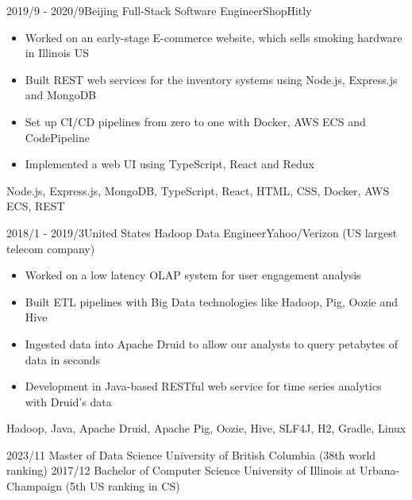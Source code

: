 \documentclass[localFont,alternative]{resume_template}
\begin{document}
\begin{experiences}
    \emptySeparator

    \experience
    {2019/9 - 2020/9}{Beijing}
    {Full-Stack Software Engineer}{ShopHitly}
    {
        \begin{itemize}
        \item Worked on an early-stage E-commerce website, which sells smoking hardware in Illinois US
        \item Built REST web services for the inventory systems using Node.js, Express.js and MongoDB
        \item Set up CI/CD pipelines from zero to one with Docker, AWS ECS and CodePipeline
        \item Implemented a web UI using TypeScript, React and Redux
        \end{itemize}
    }
    {Node.js, Express.js, MongoDB, TypeScript, React, HTML, CSS, Docker, AWS ECS, REST}

    \emptySeparator

    \experience
    {2018/1 - 2019/3}{United States}
    {Hadoop Data Engineer}{Yahoo/Verizon (US largest telecom company)}
    {
        \begin{itemize}
        \item Worked on a low latency OLAP system for user engagement analysis
        \item Built ETL pipelines with Big Data technologies like Hadoop, Pig, Oozie and Hive
        \item Ingested data into Apache Druid to allow our analysts to query petabytes of data in seconds
        \item Development in Java-based RESTful web service for time series analytics with Druid's data
        \end{itemize}
    }
    {Hadoop, Java, Apache Druid, Apache Pig, Oozie, Hive, SLF4J, H2, Gradle, Linux}

    \end{experiences}

    \begin{experiences}
    \degree
    {2023/11}
    {Master of Data Science}
    {University of British Columbia (38th world ranking)}
    \vspace{6pt}
    \degree
    {2017/12}
    {Bachelor of Computer Science}
    {University of Illinois at Urbana-Champaign (5th US ranking in CS)}
    \end{experiences}
\end{document}
